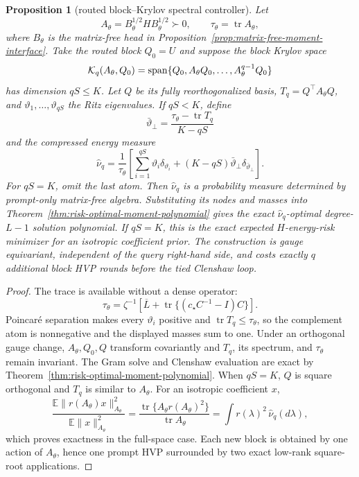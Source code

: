 \documentclass[11pt]{article}
\newtheorem{proposition}{Proposition}
\begin{document}
\begin{proposition}[routed block--Krylov spectral controller]
\label{prop:routed-krylov-measure}
Let
\[
 A_\theta=B_\theta^{1/2}HB_\theta^{1/2}\succ0,\qquad
 \tau_\theta=\operatorname{tr}A_\theta,
\]
where \(B_\theta\) is the matrix-free head in
Proposition~\ref{prop:matrix-free-moment-interface}.  Take the routed block
\(Q_0=U\) and suppose the block Krylov space
\[
 {\cal K}_q(A_\theta,Q_0)
 =\operatorname{span}\{Q_0,A_\theta Q_0,\ldots,
 A_\theta^{q-1}Q_0\}
\]
has dimension \(qS\leq K\).  Let \(Q\) be its fully reorthogonalized basis,
\(T_q=Q^\top A_\theta Q\), and
\(\vartheta_1,\ldots,\vartheta_{qS}\) the Ritz eigenvalues.  If \(qS<K\),
define
\[
 \bar\vartheta_\perp
 =\frac{\tau_\theta-\operatorname{tr}T_q}{K-qS}
\]
and the compressed energy measure
\[
 \widehat\nu_q
 =\frac1{\tau_\theta}\left[
   \sum_{i=1}^{qS}\vartheta_i\delta_{\vartheta_i}
   +(K-qS)\bar\vartheta_\perp
     \delta_{\bar\vartheta_\perp}\right].
 \label{eq:routed-krylov-energy-measure}
\]
For \(qS=K\), omit the last atom.  Then
\(\widehat\nu_q\) is a probability measure determined by prompt-only
matrix-free algebra.  Substituting its nodes and masses into
Theorem~\ref{thm:risk-optimal-moment-polynomial} gives the exact
\(\widehat\nu_q\)-optimal degree-\(L-1\) solution polynomial.  If \(qS=K\),
this is the exact expected \(H\)-energy-risk minimizer for an isotropic
coefficient prior.  The construction is gauge equivariant, independent of
the query right-hand side, and costs exactly \(q\) additional block HVP
rounds before the tied Clenshaw loop.
\end{proposition}
\begin{proof}
The trace is available without a dense operator:
\[
 \tau_\theta
 =\zeta^{-1}\left[
 \overline L+
 \operatorname{tr}\{(c_\star C^{-1}-I)C\}\right].
\]
Poincaré separation makes every \(\vartheta_i\) positive and
\(\operatorname{tr}T_q\leq\tau_\theta\), so the complement atom is
nonnegative and the displayed masses sum to one.  Under an orthogonal gauge
change, \(A_\theta,Q_0,Q\) transform covariantly and \(T_q\), its spectrum,
and \(\tau_\theta\) remain invariant.  The Gram solve and Clenshaw evaluation
are exact by Theorem~\ref{thm:risk-optimal-moment-polynomial}.  When \(qS=K\),
\(Q\) is square orthogonal and \(T_q\) is similar to \(A_\theta\).  For an
isotropic coefficient \(x\),
\[
 \frac{\mathbb E\|r(A_\theta)x\|_{A_\theta}^2}
      {\mathbb E\|x\|_{A_\theta}^2}
 =\frac{\operatorname{tr}\{A_\theta r(A_\theta)^2\}}
        {\operatorname{tr}A_\theta}
 =\int r(\lambda)^2\,\widehat\nu_q(d\lambda),
\]
which proves exactness in the full-space case.  Each new block is obtained by
one action of \(A_\theta\), hence one prompt HVP surrounded by two exact
low-rank square-root applications.
\end{proof}
\end{document}
